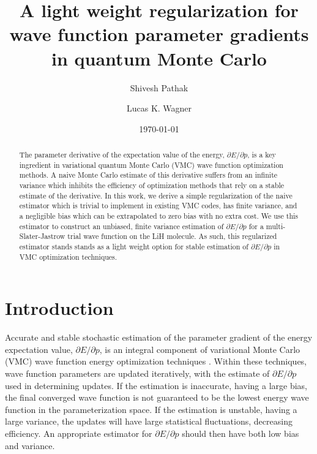\documentclass[twocolumn]{revtex4-1}
\begin{document}
\title{A light weight regularization for wave function parameter gradients
\\ in quantum Monte Carlo}

\author{Shivesh Pathak}

\author{Lucas K. Wagner}

\date{\today}
\begin{abstract}
The parameter derivative of the expectation value of the energy, $\partial E/\partial p$, is a key ingredient in variational quantum Monte Carlo (VMC) wave function optimization methods.
A naive Monte Carlo estimate of this derivative suffers from an infinite variance which inhibits the efficiency of optimization methods that rely on a stable estimate of the derivative.
In this work, we derive a simple regularization of the naive estimator which is trivial to implement in existing VMC codes, has finite variance, and a negligible bias which can be extrapolated to zero bias with no extra cost.
We use this estimator to construct an unbiased, finite variance estimation of $\partial E/\partial p$ for a multi-Slater-Jastrow trial wave function on the LiH molecule.
As such, this regularized estimator stands stands as a light weight option for stable estimation of $\partial E/\partial p$ in VMC optimization techniques.
\end{abstract}
\maketitle 

\section{Introduction}
Accurate and stable stochastic estimation of the parameter gradient of the energy expectation value, $\partial E/\partial p$, is an integral component of variational Monte Carlo (VMC) wave function energy optimization techniques \cite{PhysRevB.64.024512, doi:10.1063/1.1604379, Toulouse2007, Umrigar2005, Umrigar2007, Toulouse2008}.
Within these techniques, wave function parameters are updated iteratively, with the estimate of $\partial E/\partial p$ used in determining updates.
If the estimation is inaccurate, having a large bias, the final converged wave function is not guaranteed to be the lowest energy wave function in the parameterization space.
If the estimation is unstable, having a large variance, the updates will have large statistical fluctuations, decreasing efficiency.
An appropriate estimator for $\partial E/ \partial p$ should then have both low bias and variance.
\end{document}

